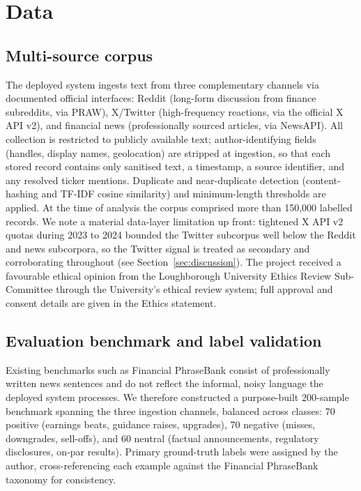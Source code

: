 \documentclass[12pt,a4paper]{article}
\begin{document}
\section{Data}\label{sec:data}
\subsection{Multi-source corpus}
The deployed system ingests text from three complementary channels via documented
official interfaces: Reddit (long-form discussion from finance subreddits, via
PRAW), X/Twitter (high-frequency reactions, via the official X API v2), and
financial news (professionally sourced articles, via NewsAPI). All collection is
restricted to publicly available text; author-identifying fields (handles, display
names, geolocation) are stripped at ingestion, so that each stored record contains
only sanitised text, a timestamp, a source identifier, and any resolved ticker
mentions. Duplicate and near-duplicate detection (content-hashing and TF-IDF
cosine similarity) and minimum-length thresholds are applied. At the time of
analysis the corpus comprised more than 150{,}000 labelled records. We note a
material data-layer limitation up front: tightened X API v2 quotas during
2023 to 2024 bounded the Twitter subcorpus well below the Reddit and news
subcorpora, so the Twitter signal is treated as secondary and corroborating
throughout (see Section~\ref{sec:discussion}). The project received a favourable
ethical opinion from the Loughborough University Ethics Review Sub-Committee through
the University's ethical review system; full approval and consent details are given
in the Ethics statement.

\subsection{Evaluation benchmark and label validation}\label{sec:benchmark}
Existing benchmarks such as Financial PhraseBank \citep{malo2014} consist of
professionally written news sentences and do not reflect the informal, noisy
language the deployed system processes. We therefore constructed a purpose-built
200-sample benchmark spanning the three ingestion channels, balanced across
classes: 70 positive (earnings beats, guidance raises, upgrades), 70 negative
(misses, downgrades, sell-offs), and 60 neutral (factual announcements, regulatory
disclosures, on-par results). Primary ground-truth labels were assigned by the
author, cross-referencing each example against the Financial PhraseBank taxonomy
for consistency.
\end{document}
